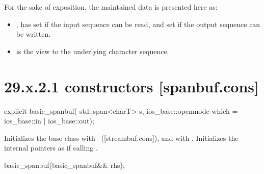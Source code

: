 \documentclass[ebook,11pt,article]{memoir}
\renewcommand{\iref}[1]{[#1]}
\begin{document}
\pnum
For the sake of exposition, the maintained data is presented here as:
\begin{itemize}
\item
{},
has
set if the input sequence can be read, and
set if the output sequence can be written.
\item
{}
is the view to the underlying character sequence.
\end{itemize}

\section{29.x.2.1  constructors [spanbuf.cons]}

%
\begin{itemdecl}
explicit basic_spanbuf(
  std::span<charT> s,
  ios_base::openmode which = ios_base::in | ios_base::out);
\end{itemdecl}

\begin{itemdescr}
\pnum
\effects
Initializes the base class with
~(\iref{streambuf.cons}), and
with . 
Initializes the internal pointers as if calling .
\end{itemdescr}

%
\begin{itemdecl}
basic_spanbuf(basic_spanbuf&& rhs);
\end{itemdecl}
\end{document}
